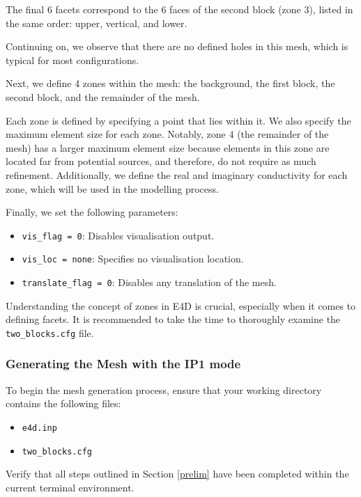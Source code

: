 \documentclass[a4paper,12pt]{article}
\begin{document}
The final 6 facets correspond to the 6 faces of the second block (zone 3), listed in the same order: upper, vertical, and lower.

Continuing on, we observe that there are no defined holes in this mesh, which is typical for most configurations.

Next, we define 4 zones within the mesh: the background, the first block, the second block, and the remainder of the mesh.

Each zone is defined by specifying a point that lies within it. We also specify the maximum element size for each zone. Notably, zone 4 (the remainder of the mesh) has a larger maximum element size because elements in this zone are located far from potential sources, and therefore, do not require as much refinement. Additionally, we define the real and imaginary conductivity for each zone, which will be used in the modelling process.

Finally, we set the following parameters:

\begin{itemize}
    \item \texttt{vis\_flag = 0}: Disables visualisation output.
    \item \texttt{vis\_loc = none}: Specifies no visualisation location.
    \item \texttt{translate\_flag = 0}: Disables any translation of the mesh.
\end{itemize}

Understanding the concept of zones in E4D is crucial, especially when it comes to defining facets. It is recommended to take the time to thoroughly examine the \texttt{two\_blocks.cfg} file.

\subsubsection{Generating the Mesh with the IP1 mode}

To begin the mesh generation process, ensure that your working directory contains the following files:

\begin{itemize}
    \item \texttt{e4d.inp}
    \item \texttt{two\_blocks.cfg}
\end{itemize}

Verify that all steps outlined in Section \ref{prelim} have been completed within the current terminal environment.
\end{document}
